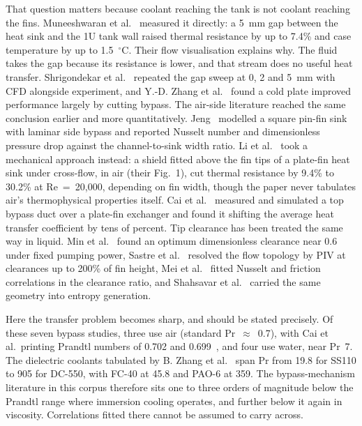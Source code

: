 \documentclass[preprint,12pt]{elsarticle}
\begin{document}
That question matters because coolant reaching the tank is not coolant reaching the fins.
Muneeshwaran et al.~\cite{muneeshwaran2023} measured it directly: a 5~mm gap between the heat sink
and the 1U tank wall raised thermal resistance by up to 7.4\% and case temperature by up to
1.5~$^{\circ}$C. Their flow visualisation explains why. The fluid takes the gap because its
resistance is lower, and that stream does no useful heat transfer. Shrigondekar et
al.~\cite{shrigondekar2023} repeated the gap sweep at 0, 2 and 5~mm with CFD alongside experiment,
and Y.-D. Zhang et al.~\cite{zhang2024pao4} found a cold plate improved performance largely by
cutting bypass. The air-side literature reached the same conclusion earlier and more
quantitatively. Jeng~\cite{jeng2008} modelled a square pin-fin sink with laminar side bypass and
reported Nusselt number and dimensionless pressure drop against the channel-to-sink width ratio.
Li et al.~\cite{li2009shield} took a mechanical approach instead: a shield fitted above the fin
tips of a plate-fin heat sink under cross-flow, in air (their Fig.~1), cut thermal resistance by
9.4\% to 30.2\% at Re~=~20{,}000, depending on fin width, though the paper never tabulates air's
thermophysical properties itself. Cai et al.~\cite{cai2019} measured and simulated a
top bypass duct over a plate-fin exchanger and found it shifting the average heat transfer
coefficient by tens of percent. Tip clearance has
been treated the same way in liquid. Min et al.~\cite{min2004} found an optimum dimensionless
clearance near 0.6 under fixed pumping power, Sastre et al.~\cite{sastre2018} resolved the flow
topology by PIV at clearances up to 200\% of fin height, Mei et al.~\cite{mei2014} fitted Nusselt
and friction correlations in the clearance ratio, and Shahsavar et al.~\cite{shahsavar2021}
carried the same geometry into entropy generation.

Here the transfer problem becomes sharp, and should be stated precisely. Of these seven bypass
studies, three use air (standard Pr~$\approx$~0.7), with Cai et al.\ printing Prandtl numbers of
0.702 and 0.699~\cite{cai2019}, and four use water, near Pr~7. The dielectric coolants tabulated
by B.
Zhang et al.~\cite{zhang2026} span Pr from 19.8 for SS110 to 905 for DC-550, with FC-40 at 45.8
and PAO-6 at 359. The bypass-mechanism literature in this corpus therefore sits one to three
orders of magnitude below the Prandtl range where immersion cooling operates, and further below
it again in viscosity. Correlations fitted there cannot be assumed to carry across.
\end{document}
